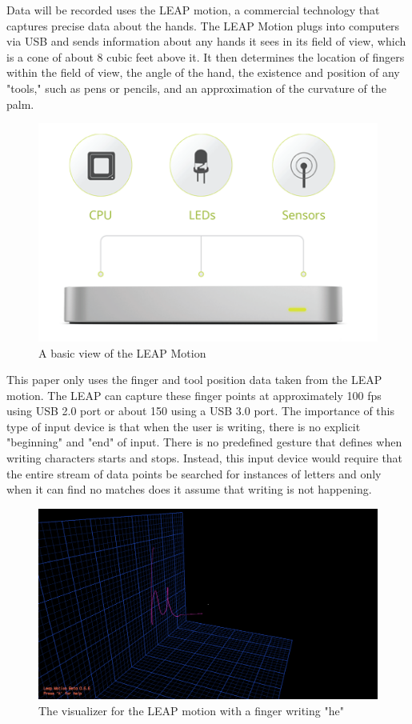 Data will be recorded uses the LEAP motion, a commercial technology that captures precise data about the hands.
The LEAP Motion plugs into computers via USB and sends information about any hands it sees in its field of view, which is a cone of about 8 cubic feet above it.
It then determines the location of fingers within the field of view, the angle of the hand, the existence and position of any "tools," such as pens or pencils, and an approximation of the curvature of the palm.
\begin{figure}
  \begin{center}
  \includegraphics[width=\columnwidth]{images/leap.jpg}
  \caption{A basic view of the LEAP Motion}
  \label{fig:teaser}
  \end{center}  
\end{figure}
This paper only uses the finger  and tool position data taken from the LEAP motion. The LEAP can capture these finger points at approximately 100 fps using USB 2.0 port or about 150 using a USB 3.0 port.
The importance of this type of input device is that when the user is writing, there is no explicit "beginning" and "end" of input. There is no predefined gesture that defines when writing characters starts and stops. Instead, this input device would require that the entire stream of data points be searched for instances of letters and only when it can find no matches does it assume that writing is not happening.
\begin{figure}
  \begin{center}
  \includegraphics[width=\columnwidth]{images/he-3d-2.PNG}
  \caption{The visualizer for the LEAP motion with a finger writing "he"}
  \label{fig:teaser}
  \end{center}  
\end{figure}
